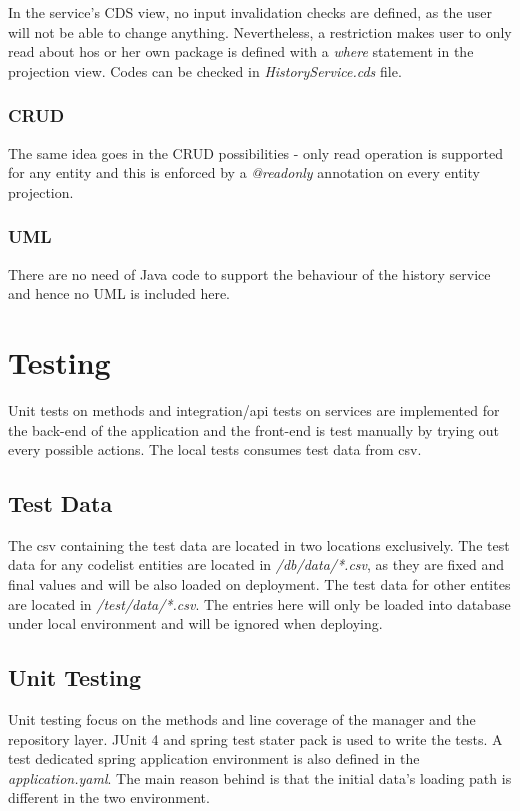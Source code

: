 \bigskip
In the service's CDS view, no input invalidation checks are defined, as the user will not be able to change anything. Nevertheless, a restriction makes user to only read about hos or her own package is defined with a \textit{where} statement in the projection view. Codes can be checked in \textit{HistoryService.cds} file.

\subsubsection{CRUD}
The same idea goes in the CRUD possibilities - only read operation is supported for any entity and this is enforced by a \textit{@readonly} annotation on every entity projection.

\subsubsection{UML}

There are no need of Java code to support the behaviour of the history service and hence no UML is included here.


\section{Testing}

Unit tests on methods and integration/api tests on services are implemented for the back-end of the application and the front-end is test manually by trying out every possible actions. The local tests consumes test data from csv. 

\subsection{Test Data}
The csv containing the test data are located in two locations exclusively. The test data for any codelist entities are located in \textit{/db/data/*.csv}, as they are fixed and final values and will be also loaded on deployment. The test data for other entites are located in \textit{/test/data/*.csv}. The entries here will only be loaded into database under local environment and will be ignored when deploying.

\subsection{Unit Testing}

Unit testing focus on the methods and line coverage of the manager and the repository layer. JUnit 4 and spring test stater pack is used to write the tests. A test dedicated spring application environment is also defined in the \textit{application.yaml}. The main reason behind is that the initial data's loading path is different in the two environment.

